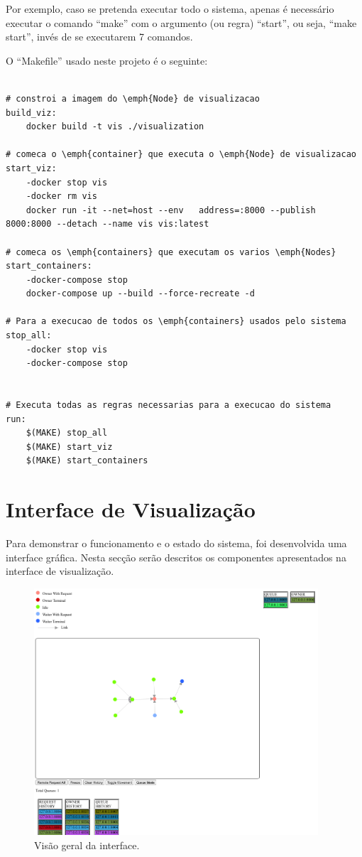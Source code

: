 Por exemplo, caso se pretenda executar todo o sistema, apenas é necessário executar o comando ``make'' com o argumento (ou regra) ``start'', ou seja, ``make start'', invés de se executarem 7 comandos.


O ``Makefile'' usado neste projeto é o seguinte:

\begin{lstlisting}[caption={Ficheiro ``Makefile''}]

# constroi a imagem do \emph{Node} de visualizacao
build_viz:
	docker build -t vis ./visualization

# comeca o \emph{container} que executa o \emph{Node} de visualizacao
start_viz:
	-docker stop vis
	-docker rm vis
	docker run -it --net=host --env   address=:8000 --publish 8000:8000 --detach --name vis vis:latest

# comeca os \emph{containers} que executam os varios \emph{Nodes}
start_containers:
	-docker-compose stop
	docker-compose up --build --force-recreate -d

# Para a execucao de todos os \emph{containers} usados pelo sistema
stop_all:
	-docker stop vis
	-docker-compose stop


# Executa todas as regras necessarias para a execucao do sistema
run:
	$(MAKE) stop_all
	$(MAKE) start_viz
	$(MAKE) start_containers
\end{lstlisting}


\section{Interface de Visualização}
\label{validacao:sec:interface}
Para demonstrar o funcionamento e o estado do sistema, foi desenvolvida uma interface gráfica. Nesta secção serão descritos os componentes apresentados na interface de visualização.

\begin{figure}[!htb]
\centering
\includegraphics[width=300pt]{relatorio_overview.png}
\caption{Visão geral da interface.}
\end{figure}

